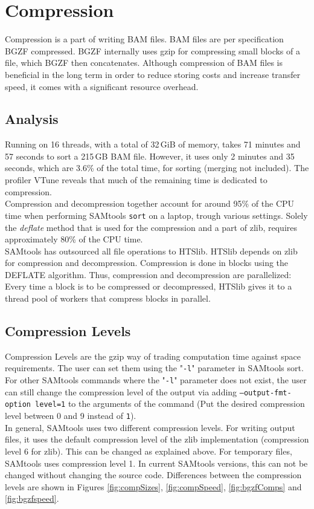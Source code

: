 \section{Compression} 
Compression is a part of writing BAM files. BAM files are per specification BGZF compressed. BGZF internally uses gzip for compressing small blocks of a file, which BGZF then concatenates. Although compression of BAM files is beneficial in the long term in order to reduce storing costs and increase transfer speed, it comes with a significant resource overhead. 

\subsection{Analysis}
Running on 16 threads, with a total of 32\,GiB of memory, \sort takes 71 minutes and 57 seconds to sort a 215\,GB BAM file. However, it uses only 2 minutes and 35 seconds, which are 3.6\% of the total time, for sorting (merging not included). The profiler VTune \cite{noauthor_fix_nodate} reveals that much of the remaining time is dedicated to compression. \\ 
Compression and decompression together account for around 95\% of the CPU time when performing SAMtools \texttt{sort} on a laptop, trough various settings. Solely the \textit{deflate} method that is used for the compression and a part of zlib, requires approximately 80\% of the CPU time. \\
SAMtools has outsourced all file operations to HTSlib. HTSlib depends on zlib for compression and decompression. Compression is done in blocks using the DEFLATE algorithm. Thus, compression and decompression are parallelized: Every time a block is to be compressed or decompressed, HTSlib gives it to a thread pool of workers that compress blocks in parallel.


\subsection{Compression Levels}
Compression Levels are the gzip way of trading computation time against space requirements. The user can set them using the "\texttt{-l}" parameter in SAMtools sort. For other SAMtools commands where the "\texttt{-l}" parameter does not exist, the user can still change the compression level of the output via adding \texttt{--output-fmt-option level=1} to the arguments of the command (Put the desired compression level between 0 and 9 instead of \texttt{1}). \\
In general, SAMtools uses two different compression levels. For writing output files, it uses the default compression level of the zlib implementation (compression level 6 for zlib). This can be changed as explained above. For temporary files, SAMtools uses compression level 1. In current SAMtools versions, this can not be changed without changing the source code.
Differences between the compression levels are shown in Figures \ref{fig:compSizes}, \ref{fig:compSpeed}, \ref{fig:bgzfComps} and \ref{fig:bgzfspeed}.

